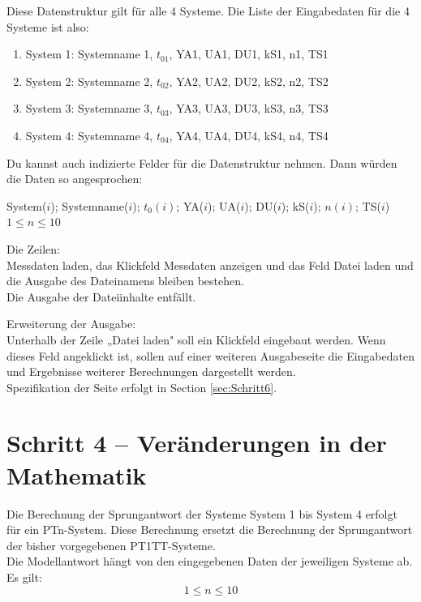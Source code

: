 \documentclass[main.tex]{subfiles}
\begin{document}
Diese Datenstruktur gilt für alle 4 Systeme.
Die Liste der Eingabedaten für die 4 Systeme ist also:
\begin{enumerate} %
    \item System 1: Systemname 1, $t_{01}$, YA1, UA1, DU1, kS1, n1, TS1
    \item System 2: Systemname 2, $t_{02}$, YA2, UA2, DU2, kS2, n2, TS2
    \item System 3: Systemname 3, $t_{03}$, YA3, UA3, DU3, kS3, n3, TS3
    \item System 4: Systemname 4, $t_{04}$, YA4, UA4, DU4, kS4, n4, TS4
\end{enumerate} %
Du kannst auch indizierte Felder für die Datenstruktur nehmen.
Dann würden die Daten so angesprochen:

System($i$); Systemname($i$); $t_0(i)$; YA($i$); UA($i$); DU($i$); kS($i$); $n(i)$; TS($i$)\\
$1 \le n \le 10$

Die Zeilen:\\
Messdaten laden, das Klickfeld Messdaten anzeigen und das Feld Datei laden und die Ausgabe des Dateinamens bleiben bestehen.\\
Die Ausgabe der Dateiinhalte entfällt.

Erweiterung der Ausgabe:\\
Unterhalb der Zeile „Datei laden" soll ein Klickfeld eingebaut werden. Wenn dieses Feld angeklickt ist, sollen auf einer weiteren Ausgabeseite die Eingabedaten und Ergebnisse weiterer Berechnungen dargestellt werden.\\
Spezifikation der Seite erfolgt in Section \ref{sec:Schritt6}.  %

\section{Schritt 4 – Veränderungen in der Mathematik}
\label{sec:Schritt4}  %
Die Berechnung der Sprungantwort der Systeme System 1 bis System 4 erfolgt für ein PTn-System. Diese Berechnung ersetzt die Berechnung der Sprungantwort der bisher vorgegebenen PT1TT-Systeme.\\
Die Modellantwort hängt von den eingegebenen Daten der jeweiligen Systeme ab.\\

Es gilt:
\begin{equation}
    1 \leq n \leq 10
\end{equation}
\end{document}
